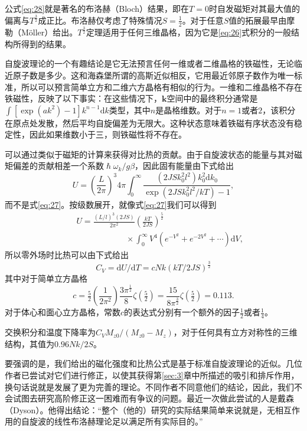\documentclass{article}
\begin{document}
公式\eqref{eq:28}就是著名的布洛赫（Bloch）结果，即在$T=0$时自发磁矩对其最大值的偏离与$T^\frac{3}{2}$成正比。布洛赫仅考虑了特殊情况$S=\tfrac{1}{2}$。对于任意$S$值的拓展最早由摩勒（M\"oller）给出。$T^\frac{3}{2}$定理适用于任何三维晶格，因为它是\eqref{eq:26}式积分的一般结构所得到的结果。

自旋波理论的一个有趣结论是它无法预言任何一维或者二维晶格的铁磁性，无论临近原子数是多少。这和海森堡所谓的高斯近似相反，它用最近邻原子数作为唯一标准，所以可以预言简单立方和二维六方晶格有相似的行为。一维和二维晶格不存在铁磁性，反映了以下事实：在这些情况下，$\mathbf{k}$空间中的最终积分通常是$\int[\exp(ak^2)-1]k^{n-1}\mathrm{d}k$类型，其中$n$是晶格维数。对于$n=1$或者$2$，该积分在原点处发散，然后平均自旋偏差为无限大。这种状态意味着铁磁有序状态没有稳定性，因此如果维数小于三，则铁磁性将不存在。

可以通过类似于磁矩的计算来获得对比热的贡献。由于自旋波状态的能量与其对磁矩偏差的贡献相差一个系数$\hslash\omega_k/g\beta$，因此固有能量由下式给出
\begin{equation} \label{eq:29}
U=\left(\frac{L}{2\pi}\right)^3 4\pi\int_0^\infty\frac{(2JSk_0^2l^2)k_0^2\mathrm{d}k_0}{\exp(2JSk_0^2l^2/kT)-1},
\end{equation}
而不是式\eqref{eq:27}。按级数展开，就像式\eqref{eq:27}我们可以得到
\begin{eqnarray} \label{eq:30}
&&U=\frac{(L/l)^3(2JS)}{2\pi^2}\left(\frac{kT}{2JS}\right)^{\frac{5}{2}}\nonumber\\
&&\phantom{~~~~~~~~~~~~~~~~~~~~~~~~~~~}\times\int_0^\infty V^4(e^{-V^2}+e^{-2V^2}+\cdots)\mathrm{d}V,
\end{eqnarray}
所以零外场时比热可以由下式给出
\begin{equation} \label{eq:31}
C_V=\mathrm{d}U/\mathrm{d}T=cNk(kT/2JS)^{\frac{3}{2}}
\end{equation}
其中对于简单立方晶格
\begin{equation} \label{eq:32}
c=\tfrac{5}{2}\left(\frac{1}{2\pi^2}\right)\frac{3\pi^{\frac{1}{2}}}{8}\zeta(\tfrac{5}{2})=\frac{15}{8\pi^{\frac{3}{2}}}\zeta(\tfrac{5}{2})=0.113.
\end{equation}
对于体心和面心立方晶格，常数$c$的表达式分别有一个额外的因子$\tfrac{1}{2}$或者$\tfrac{1}{4}$。

交换积分和温度下降率为$C_VM_{z0}/(M_{z0}-M_z)$，对于任何具有立方对称性的三维结构，其值为$0.96Nk/2S$。

要强调的是，我们给出的磁化强度和比热公式是基于标准自旋波理论的近似。几位作者已尝试对它们进行修正，以使其获得第\ref{sec:3}章中所描述的吸引和排斥作用，换句话说就是发展了更为完善的理论。不同作者不同意他们的结论，因此，我们不会试图去研究高阶修正这一困难而有争议的问题。最近一次做此尝试的人是戴森（Dyson）。他得出结论：“整个（他的）研究的实际结果简单来说就是，无相互作用的自旋波的线性布洛赫理论足以满足所有实际目的。”
\end{document}
